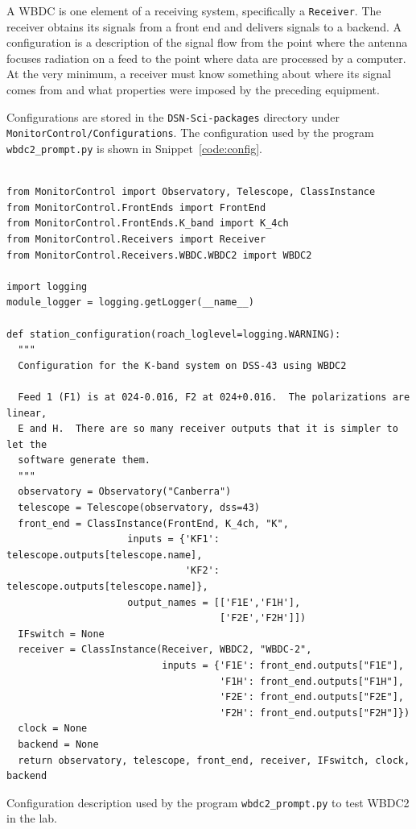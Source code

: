 \documentclass[letterpaper,11pt]{book}
\begin{document}
A WBDC is one element of a receiving system, specifically a {\tt Receiver}.  
The
receiver obtains its signals from a front end and delivers signals to a 
backend.  A configuration is a description of the signal flow from the point
where the antenna focuses radiation on a feed to the point where data are
processed by a computer.  At the very minimum, a receiver must know something
about where its signal comes from and what properties were imposed by the
preceding equipment.

Configurations are stored in the {\tt DSN-Sci-packages} directory under\linebreak
{\tt MonitorControl/Configurations}.  The configuration used by the 
program {\tt wbdc2\_prompt.py} is shown in Snippet~\ref{code:config}.
\begin{code}[h!tb]
\begin{center}
\begin{verbatim}

from MonitorControl import Observatory, Telescope, ClassInstance
from MonitorControl.FrontEnds import FrontEnd
from MonitorControl.FrontEnds.K_band import K_4ch
from MonitorControl.Receivers import Receiver
from MonitorControl.Receivers.WBDC.WBDC2 import WBDC2

import logging
module_logger = logging.getLogger(__name__)

def station_configuration(roach_loglevel=logging.WARNING):
  """
  Configuration for the K-band system on DSS-43 using WBDC2

  Feed 1 (F1) is at 024-0.016, F2 at 024+0.016.  The polarizations are linear,
  E and H.  There are so many receiver outputs that it is simpler to let the
  software generate them.
  """
  observatory = Observatory("Canberra")
  telescope = Telescope(observatory, dss=43)
  front_end = ClassInstance(FrontEnd, K_4ch, "K",
                     inputs = {'KF1': telescope.outputs[telescope.name],
                               'KF2': telescope.outputs[telescope.name]},
                     output_names = [['F1E','F1H'],
                                     ['F2E','F2H']])
  IFswitch = None
  receiver = ClassInstance(Receiver, WBDC2, "WBDC-2",
                           inputs = {'F1E': front_end.outputs["F1E"],
                                     'F1H': front_end.outputs["F1H"],
                                     'F2E': front_end.outputs["F2E"],
                                     'F2H': front_end.outputs["F2H"]})
  clock = None
  backend = None
  return observatory, telescope, front_end, receiver, IFswitch, clock, backend\end{verbatim}
\caption[Configuration used by {\tt wbdc2\_prompt.py}]{\label{code:config}
Configuration description used by the program
{\tt wbdc2\_prompt.py} to test WBDC2 in the lab.}
\end{center}
\end{code}
\end{document}
